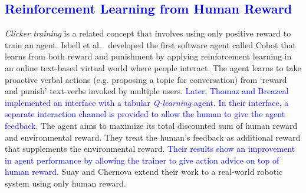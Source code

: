\subsection{\textcolor{blue}{Reinforcement Learning from Human Reward}}

\emph{Clicker training} \cite{blumberg2002integrated} is a related concept that involves using only positive reward to train an agent. %
Isbell et al.\ \cite{isbell2001social} developed the first software agent called Cobot that learns from both reward and punishment
by applying reinforcement learning in an online text-based virtual world where people interact. The agent learns to take proactive verbal actions (e.g. proposing a topic for conversation) from `reward and punish' text-verbs invoked by multiple users. %
\textcolor{blue}{Later, Thomaz and Breazeal \cite{thomaz2008teachable} implemented an interface with a tabular \emph{Q-learning} \cite{watkins1992q} agent. In their interface, a separate interaction channel is provided to allow the human to give the agent feedback.} The agent aims %
to maximize its total discounted sum of human reward and environmental reward. They treat the human's feedback as additional reward that supplements the environmental reward. \textcolor{blue}{Their results show an improvement in agent performance by allowing the trainer to give action advice on top of human reward.} 
Suay and Chernova \cite{suay2011effect} extend their work to a real-world robotic system using only human reward.%


